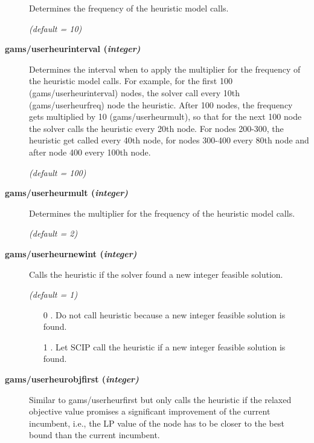 \begin{description}
Determines the frequency of the heuristic model calls.

\textsl{(default = 10)}

\item[\label{scipuserheurinterval}\hypertarget{scipuserheurinterval}
{\textbf{gams/userheurinterval (\slshape{integer})}}]\hspace{1.0in}

Determines the interval when to apply the multiplier for the frequency of the heuristic model calls.
For example, for the first 100 (gams/userheurinterval) nodes, the solver call every 10th (gams/userheurfreq) node the heuristic.
After 100 nodes, the frequency gets multiplied by 10 (gams/userheurmult), so that for the next 100 node the solver calls the heuristic every 20th node.
For nodes 200-300, the heuristic get called every 40th node, for nodes 300-400 every 80th node and after node 400 every 100th node.

\textsl{(default = 100)}

\item[\label{scipuserheurmult}\hypertarget{scipuserheurmult}
{\textbf{gams/userheurmult (\slshape{integer})}}]\hspace{1.0in}

Determines the multiplier for the frequency of the heuristic model calls.

\textsl{(default = 2)}

\item[\label{scipuserheurnewint}\hypertarget{scipuserheurnewint}
{\textbf{gams/userheurnewint (\slshape{integer})}}]\hspace{1.0in}

Calls the heuristic if the solver found a new integer feasible solution.

\textsl{(default = 1)}
\begin{itemize}
\item[0] .
Do not call heuristic because a new integer feasible solution is found.
\item[1] .
Let SCIP call the heuristic if a new integer feasible solution is found.
\end{itemize}

\item[\label{scipuserheurobjfirst}\hypertarget{scipuserheurobjfirst}
{\textbf{gams/userheurobjfirst (\slshape{integer})}}]\hspace{1.0in}

Similar to gams/userheurfirst but only calls the heuristic if the relaxed objective value promises a significant improvement of the current incumbent, i.e., the LP value of the node has to be closer to the best bound than the current incumbent.


\end{description}

